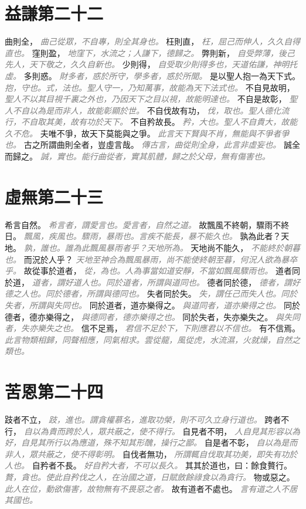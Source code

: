 \documentclass[a4paper,zihao=-4,oneside,landscape,UTF8]{ctexart}
\newcommand{\zhushi}[1]{\scriptsize{\textit{\textcolor{gray}{#1}}}\normalsize}
\begin{document}
\section{益謙第二十二}

曲則全，
\zhushi{曲己從眾，不自專，則全其身也。}
枉則直，
\zhushi{枉，屈己而伸人，久久自得直也。}
窪則盈，
\zhushi{地窪下，水流之；人謙下，德歸之。}
弊則新，
\zhushi{自受弊薄，後己先人，天下敬之，久久自新也。}
少則得，
\zhushi{自受取少則得多也，天道佑謙，神明托虛。}
多則惑。
\zhushi{財多者，惑於所守，學多者，惑於所聞。}
是以聖人抱一為天下式。
\zhushi{抱，守也。式，法也。聖人守一，乃知萬事，故能為天下法式也。}
不自見故明，
\zhushi{聖人不以其目視千裏之外也，乃因天下之目以視，故能明達也。}
不自是故彰，
\zhushi{聖人不自以為是而非人，故能彰顯於世。}
不自伐故有功，
\zhushi{伐，取也。聖人德化流行，不自取其美，故有功於天下。}
不自矜故長。
\zhushi{矜，大也。聖人不自貴大，故能久不危。}
夫唯不爭，故天下莫能與之爭。
\zhushi{此言天下賢與不肖，無能與不爭者爭也。}
古之所謂曲則全者，豈虛言哉。
\zhushi{傳古言，曲從則全身，此言非虛妄也。}
誠全而歸之。
\zhushi{誠，實也。能行曲從者，實其肌體，歸之於父母，無有傷害也。}


\section{虛無第二十三}

希言自然。
\zhushi{希言者，謂愛言也。愛言者，自然之道。}
故飄風不終朝，驟雨不終日。
\zhushi{飄風，疾風也。驟雨，暴雨也。言疾不能長，暴不能久也。}
孰為此者？天地。
\zhushi{孰，誰也。誰為此飄風暴雨者乎？天地所為。}
天地尚不能久，
\zhushi{不能終於朝暮也。}
而況於人乎？
\zhushi{天地至神合為飄風暴雨，尚不能使終朝至暮，何況人欲為暴卒乎。}
故從事於道者，
\zhushi{從，為也。人為事當如道安靜，不當如飄風驟雨也。}
道者同於道，
\zhushi{道者，謂好道人也。同於道者，所謂與道同也。}
德者同於德，
\zhushi{德者，謂好德之人也。同於德者，所謂與德同也。}
失者同於失。
\zhushi{失，謂任己而失人也。同於失者，所謂與失同也。}
同於道者，道亦樂得之。
\zhushi{與道同者，道亦樂得之也。}
同於德者，德亦樂得之，
\zhushi{與德同者，德亦樂得之也。}
同於失者，失亦樂失之。
\zhushi{與失同者，失亦樂失之也。}
信不足焉，
\zhushi{君信不足於下，下則應君以不信也。}
有不信焉。
\zhushi{此言物類相歸，同聲相應，同氣相求。雲從龍，風從虎，水流濕，火就燥，自然之類也。}


\section{苦恩第二十四}

跂者不立，
\zhushi{跂，進也。謂貪權慕名，進取功榮，則不可久立身行道也。}
跨者不行，
\zhushi{自以為貴而跨於人，眾共蔽之，使不得行。}
自見者不明，
\zhushi{人自見其形容以為好，自見其所行以為應道，殊不知其形醜，操行之鄙。}
自是者不彰，
\zhushi{自以為是而非人，眾共蔽之，使不得彰明。}
自伐者無功，
\zhushi{所謂輒自伐取其功美，即失有功於人也。}
自矜者不長。
\zhushi{好自矜大者，不可以長久。}
其其於道也，曰：餘食贅行。
\zhushi{贅，貪也。使此自矜伐之人，在治國之道，日賦斂餘祿食以為貪行。}
物或惡之。
\zhushi{此人在位，動欲傷害，故物無有不畏惡之者。}
故有道者不處也。
\zhushi{言有道之人不居其國也。}
\end{document}
